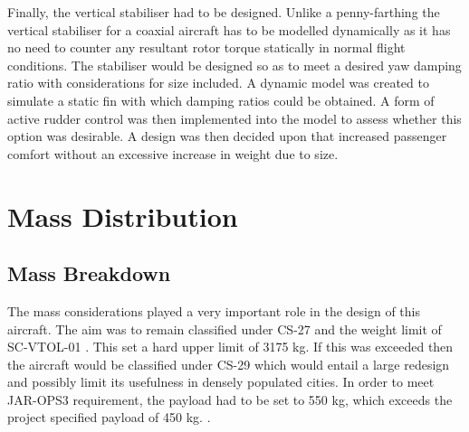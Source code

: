 \documentclass[11pt,a4paper]{article}
\begin{document}
Finally, the vertical stabiliser had to be designed. Unlike a penny-farthing the vertical stabiliser for a coaxial aircraft has to be modelled dynamically as it has no need to counter any resultant rotor torque statically in normal flight conditions. The stabiliser would be designed so as to meet a desired yaw damping ratio with considerations for size included. A dynamic model was created to simulate a static fin with which damping ratios could be obtained. A form of active rudder control was then implemented into the model to assess whether this option was desirable. A design was then decided upon that increased passenger comfort without an excessive increase in weight due to size.

\section{Mass Distribution}
\subsection{Mass Breakdown}
The mass considerations played a very important role in the design of this aircraft. The aim was to remain classified under CS-27 \cite{cs27} and the weight limit of SC-VTOL-01 \cite{scvtol}. This set a hard upper limit of 3175 kg. If this was exceeded then the aircraft would be classified under CS-29 which would entail a large redesign and possibly limit its usefulness in densely populated cities. In order to meet JAR-OPS3 requirement, the payload had to be set to 550 kg, which exceeds the project specified payload of 450 kg. \cite{jarops3}.
\end{document}
